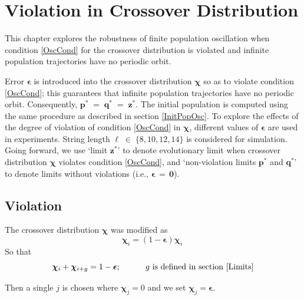 \chapter{Violation in Crossover Distribution} \label{ch:chiviolation}
This chapter explores the robustness of finite population oscillation when condition \ref{OscCond} 
for the crossover distribution is violated and infinite population trajectories
have no periodic orbit.

Error $\bm{\epsilon}$ is introduced into the crossover distribution $\bm{\chi}$ so as to 
violate condition \ref{OscCond}; this guarantees that 
infinite population trajectories have no periodic orbit. Consequently, $\bm{p}^\ast \;=\; \bm{q}^\ast \;=\; \bm{z}^\ast$. 
The initial population is 
computed using the same procedure as described in section \ref{InitPopOsc}. To explore the effects of the degree  
of violation of condition \ref{OscCond} in $\bm{\chi}$, different values of $\bm{\epsilon}$ are used in experiments. 
String length $\ell \;\in\; \{8, 10, 12, 14\}$ is considered for simulation.
Going forward, we use `limit $\bm{z}^\ast$' to denote evolutionary limit when crossover distribution 
$\bm{\chi}$ violates condition \ref{OscCond}, and 
`non-violation limits $\bm{p}^\ast$ and $\bm{q}^\ast$' to denote limits without violations (i.e., $\bm{\epsilon \,=\, 0}$).

\section{Violation}
The crossover distribution $\bm{\chi}$ was modified as
\[
\bm{\chi}_i = (1-\bm{\epsilon}) \bm{\chi}_i\ 
\]
So that 
\[
\bm{\chi}_i + \bm{\chi}_{i+g} = 1-\bm{\epsilon} ; \hspace{30pt} g \text{ is defined in  section } \ref{Limits}
\]

Then a single $j$ is chosen where $\bm{\chi}_j = 0$ and we set $\bm{\chi}_j = \bm{\epsilon}$. 

